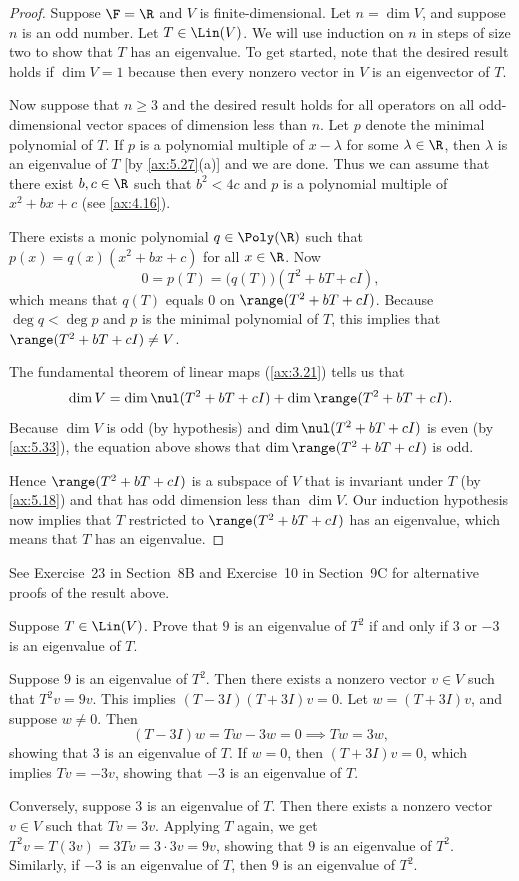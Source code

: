 \begin{proof}
Suppose $\F=\R$ and $V$ is finite-dimensional. Let $n=\dim V$, and suppose
$n$ is an odd number. Let $T\in\Lin(V)$. We will use induction on $n$ in steps
of size two to show that $T$ has an eigenvalue. To get started, note that the
desired result holds if $\dim V=1$ because then every nonzero vector in $V$ is
an eigenvector of $T$.

Now suppose that $n\ge3$ and the desired result holds for all operators on all
odd-dimensional vector spaces of dimension less than $n$. Let $p$ denote the
minimal polynomial of $T$. If $p$ is a polynomial multiple of $x-\lambda$ for
some $\lambda\in\R$, then $\lambda$ is an eigenvalue of $T$ [by
\ref{ax:5.27}(a)] and we are done. Thus we can assume that there exist
$b,c\in\R$ such that $b^2<4c$ and $p$ is a polynomial multiple of $x^2+bx+c$
(see \ref{ax:4.16}).

There exists a monic polynomial $q\in\Poly(\R)$ such that
$p(x)=q(x)(x^2+bx+c)$ for all $x\in\R$. Now
\[ 0=p(T)=\bigl(q(T)\bigr)(T^2+bT+cI), \]
which means that $q(T)$ equals $0$ on $\range(T^2+bT+cI)$. Because
$\deg q<\deg p$ and $p$ is the minimal polynomial of $T$, this implies that
$\range(T^2+bT+cI)\ne V$.

The fundamental theorem of linear maps (\ref{ax:3.21}) tells us that
\[ \dim V=\dim\nul(T^2+bT+cI)+\dim\range(T^2+bT+cI). \]
Because $\dim V$ is odd (by hypothesis) and $\dim\nul(T^2+bT+cI)$ is even (by
\ref{ax:5.33}), the equation above shows that $\dim\range(T^2+bT+cI)$ is odd.

Hence $\range(T^2+bT+cI)$ is a subspace of $V$ that is invariant under $T$
(by \ref{ax:5.18}) and that has odd dimension less than $\dim V$. Our
induction hypothesis now implies that $T$ restricted to $\range(T^2+bT+cI)$
has an eigenvalue, which means that $T$ has an eigenvalue.
\end{proof}

See Exercise~23 in Section~8B and Exercise~10 in Section~9C for alternative
proofs of the result above.


\begin{exercise}
Suppose $T\in\Lin(V)$. Prove that $9$ is an eigenvalue of $T^2$ if and only if
$3$ or $-3$ is an eigenvalue of $T$.
\end{exercise}
\begin{solution}
Suppose $9$ is an eigenvalue of $T^2$. Then there exists a nonzero vector
$v\in V$ such that $T^2v=9v$. This implies $(T-3I)(T+3I)v=0$. Let
$w=(T+3I)v$, and suppose $w\ne0$. Then
\[ (T-3I)w=Tw-3w=0 \implies Tw=3w, \]
showing that $3$ is an eigenvalue of $T$. If $w=0$, then $(T+3I)v=0$, which
implies $Tv=-3v$, showing that $-3$ is an eigenvalue of $T$.

Conversely, suppose $3$ is an eigenvalue of $T$. Then there exists a nonzero
vector $v\in V$ such that $Tv=3v$. Applying $T$ again, we get
$T^2v=T(3v)=3Tv=3\cdot3v=9v$, showing that $9$ is an eigenvalue of $T^2$.
Similarly, if $-3$ is an eigenvalue of $T$, then $9$ is an eigenvalue of
$T^2$.
\end{solution}

